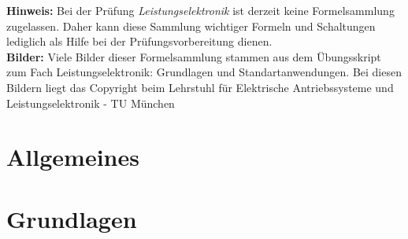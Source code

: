 \documentclass[fs, footer]{latex4ei}
\begin{document}
\begin{multicols*}{4}




\textbf{Hinweis: } Bei der Prüfung \emph{Leistungselektronik} ist derzeit keine Formelsammlung zugelassen. Daher kann diese Sammlung wichtiger Formeln und Schaltungen lediglich als Hilfe bei der Prüfungsvorbereitung dienen. \\ 

\textbf{Bilder:} 
Viele Bilder dieser Formelsammlung stammen aus dem Übungsskript zum Fach Leistungselektronik: Grundlagen und Standartanwendungen. Bei diesen Bildern liegt das Copyright beim Lehrstuhl für Elektrische Antriebssysteme und Leistungselektronik - TU München

\section*{Allgemeines}






\section{Grundlagen}

\end{multicols*}
\end{document}
